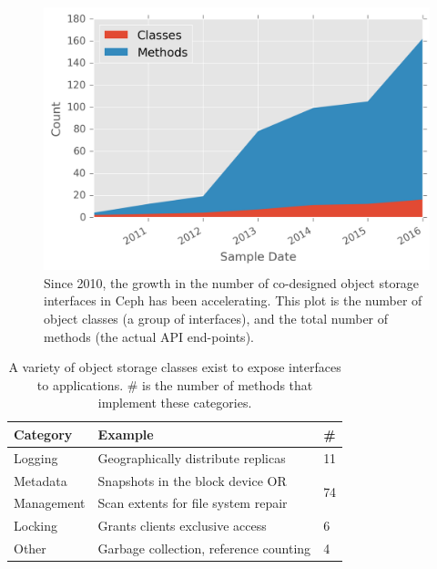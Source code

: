 \begin{figure}[ht]
\centering
\includegraphics{figures/obj-int-dev-growth.png}
\caption{Since 2010, the growth in the number of co-designed object storage
interfaces in Ceph has been accelerating. This plot is the number of object
classes (a group of interfaces), and the total number of methods (the actual
API end-points).}
\label{fig:obj-int-dev-growth}
\end{figure}

\begin{table}[ht]
\centering
  \begin{tabular}{l|l|l}
    Category & Example & \# \\ \hline
    Logging  & Geographically distribute replicas & 11 \\ \hdashline
    Metadata & Snapshots in the block device OR  & \multirow{2}{*}{74} \\
    Management & Scan extents for file system repair & \\ \hdashline
    Locking  & Grants clients exclusive access & 6 \\ \hdashline
    Other & Garbage collection, reference counting  & 4\\
\end{tabular}
\caption{A variety of object storage classes exist to expose interfaces
    to applications. \# is the number of methods that implement these categories.
}
\label{table:objclasses}
\end{table}

